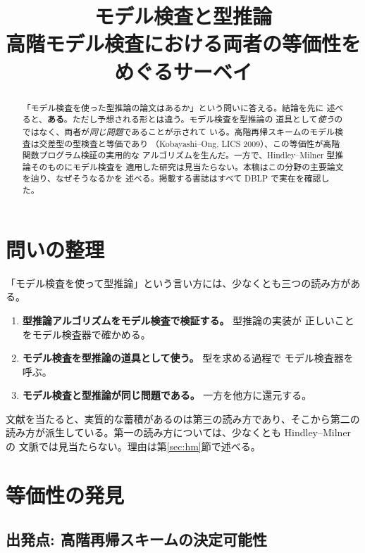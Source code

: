\documentclass[11pt,a4paper]{ltjsarticle}
\title{モデル検査と型推論\\\large 高階モデル検査における両者の等価性をめぐるサーベイ}
\author{}
\date{}
\begin{document}
\maketitle

\begin{abstract}
「モデル検査を使った型推論の論文はあるか」という問いに答える。結論を先に
述べると、\textbf{ある}。ただし予想される形とは違う。モデル検査を型推論の
道具として\emph{使う}のではなく、両者が\emph{同じ問題}であることが示されて
いる。高階再帰スキームのモデル検査は交差型の型検査と等価であり
（Kobayashi--Ong, LICS 2009）、この等価性が高階関数プログラム検証の実用的な
アルゴリズムを生んだ。一方で、Hindley--Milner 型推論そのものにモデル検査を
適用した研究は見当たらない。本稿はこの分野の主要論文を辿り、なぜそうなるかを
述べる。掲載する書誌はすべて DBLP で実在を確認した。
\end{abstract}

\tableofcontents

\section{問いの整理}

「モデル検査を使って型推論」という言い方には、少なくとも三つの読み方がある。

\begin{enumerate}
  \item \textbf{型推論アルゴリズムをモデル検査で検証する。} 型推論の実装が
  正しいことをモデル検査器で確かめる。
  \item \textbf{モデル検査を型推論の道具として使う。} 型を求める過程で
  モデル検査器を呼ぶ。
  \item \textbf{モデル検査と型推論が同じ問題である。} 一方を他方に還元する。
\end{enumerate}

文献を当たると、実質的な蓄積があるのは第三の読み方であり、そこから第二の
読み方が派生している。第一の読み方については、少なくとも Hindley--Milner の
文脈では見当たらない。理由は第\ref{sec:hm}節で述べる。

\section{等価性の発見}

\subsection{出発点: 高階再帰スキームの決定可能性}
\end{document}
